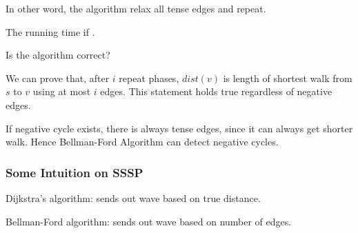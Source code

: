 In other word, the algorithm relax all tense edges and repeat.

The running time if .

Is the algorithm correct?

We can prove that, after $i$ repeat phases,
$dist(v)$ is length of shortest walk from $s$ to $v$ using at most $i$ edges.
This statement holds true regardless of negative edges.

If negative cycle exists, there is always tense edges,
since it can always get shorter walk.
Hence Bellman-Ford Algorithm can detect negative cycles.

\subsubsection{Some Intuition on SSSP}
Dijkstra's algorithm: sends out wave based on true distance.

\noindent Bellman-Ford algorithm: sends out wave based on number of edges.



